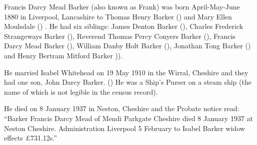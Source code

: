 
Francis Darcy Mead Barker (also known as Frank)  was born April-May-June 1880 in Liverpool, Lancashire to Thomas Henry Barker () and Mary Ellen Moulsdale ()  \cite{FBarkerBirth}. He had six siblings: James Denton Barker (), Charles Frederick Strangeways Barker (), Reverend Thomas Percy Conyers Barker (), Francis Darcy Mead Barker (), William Danby Holt Barker (), Jonathan Tong Barker () and Henry Bertram Mitford Barker )).

He married Isabel Whitehead on 19 May 1910 in the Wirral, Cheshire \cite{FBarkerMarriage} and they had one son, John Darcy Barker. ()
He was a Ship's Purser on a steam ship (the name of which is not legible in the census record). \cite{FBarkerOccupation}

He died on 8 January 1937 in	Neston, Cheshire \cite{FBarkerDeath} and the Probate notice read:
``Barker Francis Darcy Mead of Mendi Parkgate Cheshire died 8 January 1937 at Neston Cheshire.
Administration Liverpool 5 February to Isabel Barker widow effects \pounds 731.12s.''

